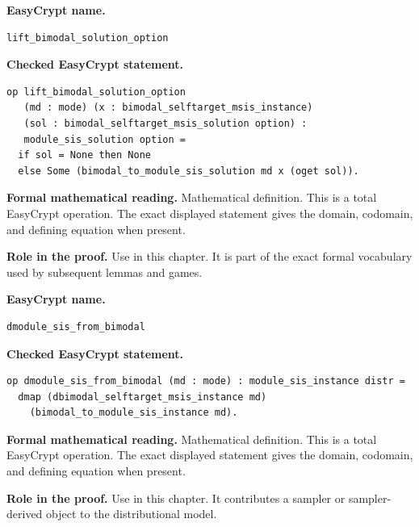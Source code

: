 \begin{formaldefinition}
\noindent\textbf{EasyCrypt name.}
\begin{lstlisting}[language=EasyCrypt,basicstyle=\ttfamily\scriptsize]
lift_bimodal_solution_option
\end{lstlisting}
\noindent\textbf{Checked EasyCrypt statement.}
\begin{lstlisting}[language=EasyCrypt,basicstyle=\ttfamily\scriptsize]
op lift_bimodal_solution_option
   (md : mode) (x : bimodal_selftarget_msis_instance)
   (sol : bimodal_selftarget_msis_solution option) :
   module_sis_solution option =
  if sol = None then None
  else Some (bimodal_to_module_sis_solution md x (oget sol)).
\end{lstlisting}
\noindent\textbf{Formal mathematical reading.}
Mathematical definition. This is a total EasyCrypt operation.  The exact displayed statement gives the domain, codomain, and defining equation when present.

\noindent\textbf{Role in the proof.}
Use in this chapter. It is part of the exact formal vocabulary used by subsequent lemmas and games.

\end{formaldefinition}

\begin{formaldefinition}
\noindent\textbf{EasyCrypt name.}
\begin{lstlisting}[language=EasyCrypt,basicstyle=\ttfamily\scriptsize]
dmodule_sis_from_bimodal
\end{lstlisting}
\noindent\textbf{Checked EasyCrypt statement.}
\begin{lstlisting}[language=EasyCrypt,basicstyle=\ttfamily\scriptsize]
op dmodule_sis_from_bimodal (md : mode) : module_sis_instance distr =
  dmap (dbimodal_selftarget_msis_instance md)
    (bimodal_to_module_sis_instance md).
\end{lstlisting}
\noindent\textbf{Formal mathematical reading.}
Mathematical definition. This is a total EasyCrypt operation.  The exact displayed statement gives the domain, codomain, and defining equation when present.

\noindent\textbf{Role in the proof.}
Use in this chapter. It contributes a sampler or sampler-derived object to the distributional model.

\end{formaldefinition}

